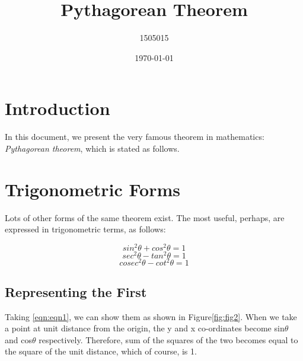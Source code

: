 \documentclass{article}
\title{Pythagorean Theorem}
\author{1505015}
\date{\today}
\begin{document}
\maketitle
\section{Introduction}
In this document, we present the very famous theorem in mathematics:  \textit{Pythagorean
theorem}, which is stated as follows.



\newpage



\section{Trigonometric Forms}
Lots of other forms of the same theorem exist. The most useful, perhaps, are
expressed in trigonometric terms, as follows:

\begin{equation}
    sin^2\theta + cos^2\theta = 1
\label{eqn:eqn1}
\end{equation}
\begin{equation}
    sec^2\theta - tan^2\theta = 1
\label{eqn:eqn2}
\end{equation}
\begin{equation}
    cosec^2\theta - cot^2\theta = 1
\label{eqn:eqn3}
\end{equation}

\subsection{Representing the First}
Taking \ref{eqn:eqn1}, we can show them as shown in Figure\ref{fig:fig2}. When we take a point at
unit distance from the origin, the y and x co-ordinates become sin$\theta$ and cos$\theta$
respectively. Therefore, sum of the squares of the two becomes equal to the
square of the unit distance, which of course, is 1.
\end{document}
